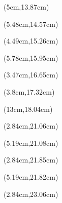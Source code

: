 \documentclass[a4paper]{article}
\begin{document}
\begin{Form}
\begin{textblock*}{13cm}(5cm,13.87cm) %
\Kontaktperson
\end{textblock*}

\begin{textblock*}{12.4cm}(5.48cm,14.57cm) %
\TelefonNummer
\end{textblock*}

\begin{textblock*}{13.4cm}(4.49cm,15.26cm) %
\end{textblock*}

\begin{textblock*}{12.2cm}(5.78cm,15.95cm) %
\PLZOrt
\end{textblock*}

\begin{textblock*}{14.6cm}(3.47cm,16.65cm) %
\Fax
\end{textblock*}

\begin{textblock*}{14.2cm}(3.8cm,17.32cm) %
\EMail
\end{textblock*}

\begin{textblock*}{5cm}(13cm,18.04cm) %
\Betriebsnummer
\end{textblock*}

\begin{textblock*}{0.3cm}(2.84cm,21.06cm) %
\end{textblock*}

\begin{textblock*}{5cm}(5.19cm,21.08cm) %
\beginnt
\end{textblock*}

\begin{textblock*}{0.3cm}(2.84cm,21.85cm) %
\end{textblock*}

\begin{textblock*}{5cm}(5.19cm,21.82cm) %
\besteht
\end{textblock*}

\begin{textblock*}{0.3cm}(2.84cm,23.06cm) %
\end{textblock*}


\end{Form}
\end{document}
